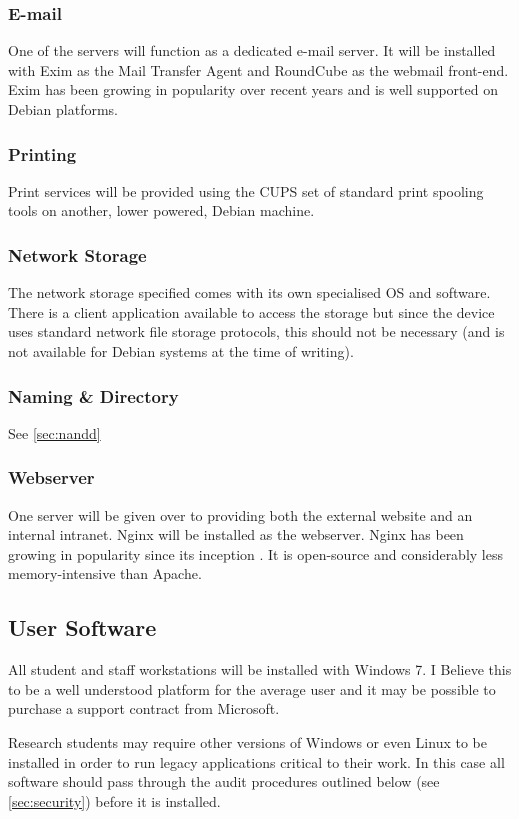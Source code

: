 \documentclass[a4paper, twoside]{article}
\begin{document}
\subsubsection{E-mail}
One of the servers will function as a dedicated e-mail server. It will be
installed with Exim as the Mail Transfer Agent and RoundCube as the webmail
front-end. Exim has been growing in popularity over recent years and is well
supported on Debian platforms\cite{exim}.

\subsubsection{Printing}
Print services will be provided using the CUPS set of standard print spooling
tools on another, lower powered, Debian machine.

\subsubsection{Network Storage}
The network storage specified comes with its own specialised OS and software.
There is a client application available to access the storage but since the
device uses standard network file storage protocols, this should not be
necessary (and is not available for Debian systems at the time of writing).

\subsubsection{Naming \& Directory}
See \ref{sec:nandd}

\subsubsection{Webserver}
One server will be given over to providing both the external website and an
internal intranet. Nginx will be installed as the webserver. Nginx has been
growing in popularity since its inception \cite{nginx}. It is open-source and
considerably less memory-intensive than Apache.

\subsection{User Software}
All student and staff workstations will be installed with Windows 7. I Believe
this to be a well understood platform for the average user and it may be
possible to purchase a support contract from Microsoft.

Research students may require other versions of Windows or even Linux to be
installed in order to run legacy applications critical to their work. In this
case all software should pass through the audit procedures outlined below (see
\ref{sec:security}) before it is installed.
\end{document}

